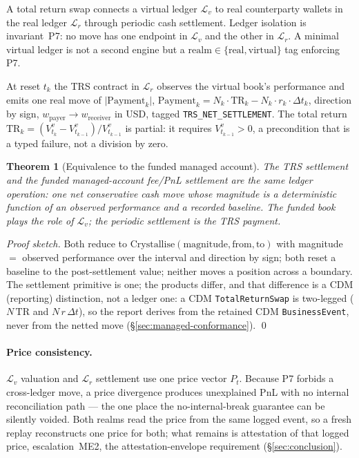 \documentclass[11pt,a4paper]{article}
\newtheorem{theorem}[definition]{Theorem}
\begin{document}
A total return swap connects a virtual ledger $\mathcal{L}_v$ to real counterparty wallets in the
real ledger $\mathcal{L}_r$ through periodic cash settlement. Ledger isolation is invariant~P7: no
move has one endpoint in $\mathcal{L}_v$ and the other in $\mathcal{L}_r$. A minimal virtual
ledger is not a second engine but a $\mathrm{realm}\in\{\text{real},\text{virtual}\}$ tag enforcing
P7.

At reset $t_k$ the TRS contract in $\mathcal{L}_r$ observes the virtual book's performance and
emits one real move of $\big|\mathrm{Payment}_k\big|$,
$\mathrm{Payment}_k=N_k\cdot\mathrm{TR}_k-N_k\cdot r_k\cdot\Delta t_k$, direction by sign,
$w_{\text{payer}}\to w_{\text{receiver}}$ in USD, tagged \texttt{TRS\_NET\_SETTLEMENT}. The total
return $\mathrm{TR}_k=(V^v_{t_k}-V^v_{t_{k-1}})/V^v_{t_{k-1}}$ is partial: it requires
$V^v_{t_{k-1}}>0$, a precondition that is a typed failure, not a division by zero.

\begin{theorem}[Equivalence to the funded managed account]
\label{thm:trs-equiv}
The TRS settlement and the funded managed-account fee/PnL settlement are the same ledger
operation: one net conservative cash move whose magnitude is a deterministic function of an
observed performance and a recorded baseline. The funded book plays the role of $\mathcal{L}_v$;
the periodic settlement is the TRS payment.
\end{theorem}
\noindent\textit{Proof sketch.} Both reduce to
$\mathrm{Crystallise}(\text{magnitude},\text{from},\text{to})$ with magnitude $=$ observed
performance over the interval and direction by sign; both reset a baseline to the post-settlement
value; neither moves a position across a boundary. The settlement primitive is one; the products
differ, and that difference is a CDM (reporting) distinction, not a ledger one: a CDM
\texttt{TotalReturnSwap} is two-legged ($N\,\mathrm{TR}$ and $N\,r\,\Delta t$), so the report
derives from the retained CDM \texttt{BusinessEvent}, never from the netted move
(\S\ref{sec:managed-conformance}). \qed

\paragraph{Price consistency.} $\mathcal{L}_v$ valuation and $\mathcal{L}_r$ settlement use one
price vector $P_t$. Because P7 forbids a cross-ledger move, a price divergence produces unexplained
PnL with no internal reconciliation path --- the one place the no-internal-break guarantee can be
silently voided. Both realms read the price from the same logged event, so a fresh replay
reconstructs one price for both; what remains is attestation of that logged price, escalation~ME2,
the attestation-envelope requirement (\S\ref{sec:conclusion}).
\end{document}
